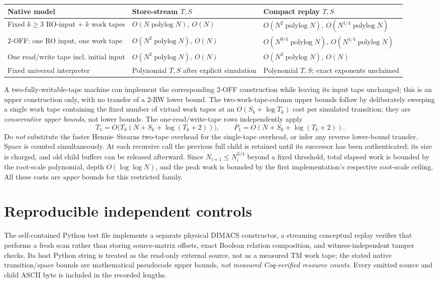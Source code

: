 \documentclass[11pt]{article}
\newcommand{\polylog}{\operatorname{polylog}}
\begin{document}
\begin{center}
\scriptsize\begin{tabular}{p{.18\linewidth}p{.30\linewidth}p{.32\linewidth}}\toprule
Native model & Store-stream $T,S$ & Compact replay $T,S$\\\midrule
Fixed $k\ge3$ RO-input + $k$ work tapes & $O(N\polylog N),\ O(N)$ & $O(N^2\polylog N),\ O(N^{1/4}\polylog N)$\\
2-OFF: one RO input, one work tape & $O(N^2\polylog N),\ O(N)$ & $O(N^{9/4}\polylog N),\ O(N^{1/4}\polylog N)$\\
One read/write tape incl. initial input & $O(N^2\polylog N),\ O(N)$ & $O(N^3\polylog N),\ O(N)$\\
Fixed universal interpreter & Polynomial $T,S$ after explicit simulation & Polynomial $T,S$; exact exponents unclaimed\\\bottomrule\end{tabular}
\end{center}
A two-fully-writable-tape machine can implement the corresponding 2-OFF construction while leaving its input tape unchanged; this is an upper construction only, with no transfer of a 2-RW lower bound. The two-work-tape-column upper bounds follow by deliberately sweeping a single work tape containing the fixed number of virtual work tapes at an $O(S_k+\log T_k)$ cost per simulated transition; they are \emph{conservative upper bounds}, not lower bounds. The one-read/write-tape rows independently apply
\[
 T_1=O\!\bigl(T_k(N+S_k+\log(T_k+2))\bigr),\qquad P_1=O(N+S_k+\log(T_k+2)).
\]
Do \emph{not} substitute the faster Hennie--Stearns two-tape overhead for the single-tape overhead, or infer any reverse lower-bound transfer. Space is counted simultaneously. At each recursive call the previous full child is retained until its successor has been authenticated; its size is charged, and old child buffers can be released afterward. Since $N_{i+1}\le N_i^{3/4}$ beyond a fixed threshold, total elapsed work is bounded by the root-scale polynomial, depth $O(\log\log N)$, and the peak work is bounded by the first implementation's respective root-scale ceiling. All these costs are \emph{upper} bounds for this restricted family.

\section{Reproducible independent controls}
The self-contained Python test file  implements a separate physical DIMACS constructor, a streaming conceptual replay verifier that performs a fresh scan rather than storing source-matrix offsets, exact Boolean relation composition, and witness-independent tamper checks. Its host Python string is treated as the read-only external source, not as a measured TM work tape; the stated native transition/space bounds are mathematical pseudocode upper bounds, \emph{not measured Coq-verified resource counts}. Every emitted source and child ASCII byte is included in the recorded lengths.
\end{document}
